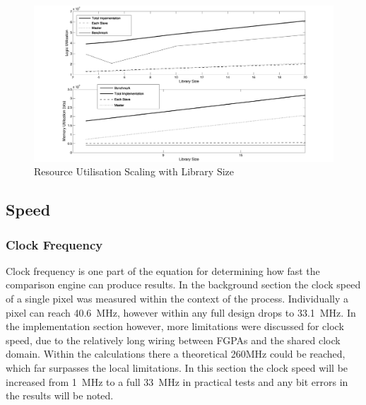 \begin{figure}[p]
  \centering
  \includegraphics[height=0.4\textheight]{./figs/eps/lib_size.pdf}
  \caption{Resource Utilisation Scaling with Library Size}
    \label{fig:lib}
\end{figure}

\pagebreak
\subsection{Speed}
\subsubsection{Clock Frequency}
Clock frequency is one part of the equation for determining how fast the comparison engine can produce results. In the background section the clock speed of a single pixel was measured within the context of the process. Individually a pixel can reach 40.6~MHz, however within any full design drops to 33.1~MHz. In the implementation section however, more limitations were discussed for clock speed, due to the relatively long wiring between FGPAs and the shared clock domain. Within the calculations there a theoretical 260MHz could be reached, which far surpasses the local limitations. In this section the clock speed will be increased from 1~MHz to a full 33~MHz in practical tests and any bit errors in the results will be noted.



